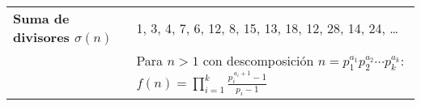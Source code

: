 \begin{center}
{\begin{tabular}{|p{}|p{}|}
\textbf{Suma de divisores $\sigma(n)$} &
1, 3, 4, 7, 6, 12, 8, 15, 13, 18, 12, 28, 14, 24, \dots \\ \cline{2-2}
& Para $n>1$ con descomposición $n=p_{1}^{a_{1}}p_{2}^{a_{2}}\cdots p_{k}^{a_{k}}$:
$\displaystyle f(n)=\prod_{i=1}^{k}\frac{p_{i}^{\,a_{i}+1}-1}{p_{i}-1}$ \\ \hline

\end{tabular}
}
\end{center}
